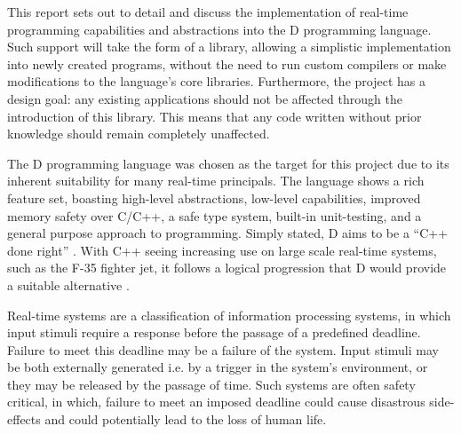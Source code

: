 






This report sets out to detail and discuss the implementation of real-time 
programming capabilities and abstractions into the D programming language. 
Such support will take the form of a library, allowing a simplistic implementation 
into newly created programs, without the need to run custom compilers or make
modifications to the language's core libraries. Furthermore, the project has a design 
goal: any existing applications should not be affected through the introduction 
of this library. This means that any code written without prior knowledge should 
remain completely unaffected. 
\par\bigskip\noindent
The D programming language was chosen as the target for this project due to its 
inherent suitability for many real-time principals. The language shows a rich 
feature set, boasting high-level abstractions, low-level capabilities, 
improved memory safety over C/C++, a safe type 
system, built-in unit-testing,  and a general purpose approach 
to programming. Simply stated, D aims to be a ``C++ done right'' \cite{qznc-tutorial}. 
With C++ seeing increasing use on large scale real-time systems, such as the F-35 
fighter jet, it follows a logical progression that D would provide a suitable 
alternative \cite{f35}.
\par\bigskip\noindent
Real-time systems are a classification of 
information processing systems, in which input
stimuli require a response before the passage of a predefined deadline. Failure 
to meet this deadline may be a failure of the system. Input 
stimuli may be both externally generated i.e. by a trigger in the system's 
environment, or they may be released by the passage of time. Such systems are 
often safety critical, in which, failure to meet an imposed deadline could
cause disastrous side-effects and could potentially lead to the loss of human life. 
